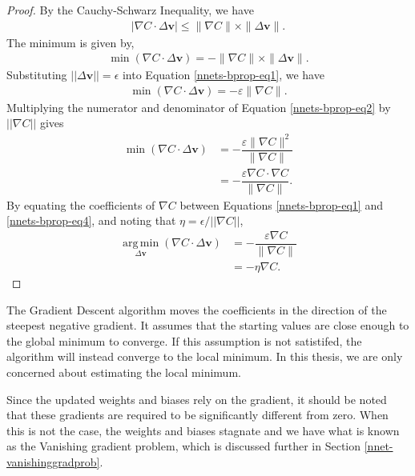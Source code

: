 \begin{proof}
	By the Cauchy-Schwarz Inequality, we have
	\begin{align}
			|\nabla C\cdot\Delta\mathbf{v}| \le \|\nabla C\|\times\|\Delta\mathbf{v}\|.
	\end{align}
	The minimum is given by,
	\begin{align}\label{nnets-bprop-eq1}
		\min(\nabla C\cdot\Delta\mathbf{v}) = -\|\nabla C\|\times\|\Delta\mathbf{v}\|.
	\end{align}
	Substituting $||\Delta\mathbf{v}|| = \epsilon$ into Equation 	\eqref{nnets-bprop-eq1}, we have
	\begin{align}\label{nnets-bprop-eq2}
		\min(\nabla C\cdot\Delta\mathbf{v}) = -\varepsilon\|\nabla C\|.
	\end{align}
	Multiplying the numerator and denominator of Equation \eqref{nnets-bprop-eq2} by $||\nabla C||$ gives
	\begin{align}\label{nnets-bprop-eq3}
		\min(\nabla C\cdot\Delta\mathbf{v}) & = -\dfrac{\varepsilon\|\nabla C\|^2}{\|\nabla C\|}\\[1em]
		& = -\dfrac{\varepsilon\nabla C\cdot\nabla C}{\|\nabla C\|} \label{nnets-bprop-eq4}.
	\end{align}
	By equating the coefficients of $\nabla C$ between Equations \eqref{nnets-bprop-eq1} and \eqref{nnets-bprop-eq4}, and noting that $\eta = \epsilon / ||\nabla C||$,
	\begin{align}
		\operatorname*{arg\,min}_{\Delta\mathbf{v}}(\nabla C\cdot\Delta\mathbf{v}) & = -\dfrac{\varepsilon\nabla C}{\|\nabla C\|} \\
		& = -\eta\nabla C.
	\end{align}	
\end{proof}

The Gradient Descent algorithm moves the coefficients in the direction of the steepest negative gradient. It assumes that the starting values are close enough to the global minimum to converge. If this assumption is not satistifed, the algorithm will instead converge to the local minimum. In this thesis, we are only concerned about estimating the local minimum.

Since the updated weights and biases rely on the gradient, it should be noted that these gradients are required to be significantly different from zero. When this is not the case, the weights and biases stagnate and we have what is known as the Vanishing gradient problem, which is discussed further in Section \ref{nnet-vanishinggradprob}.

